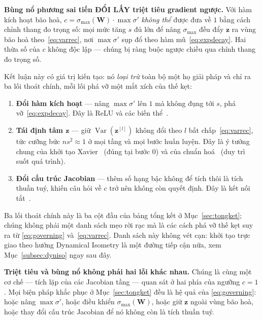 \begin{notebox}
\textbf{Bùng nổ phương sai tiến ĐỔI LẤY triệt tiêu gradient ngược.} Với hàm kích
hoạt bão hoà, $c = \sigma_{\max}(\mathbf{W})\cdot\max\sigma'$ \emph{không thể}
được đưa về $1$ bằng cách chỉnh thang đo trọng số: mọi mức tăng $s$ đủ lớn để
nâng $\sigma_{\max}$ đều đẩy $\mathbf{z}$ ra vùng bão hoà theo~\eqref{eq:varrec},
nơi $\max\sigma'$ sụp đổ theo hàm mũ~\eqref{eq:expdecay}. Hai thừa số của $c$
không độc lập --- chúng bị ràng buộc ngược chiều qua chính thang đo trọng số.
\end{notebox}

Kết luận này có giá trị kiến tạo: nó \emph{loại trừ} toàn bộ một họ giải pháp và
chỉ ra ba lối thoát chính, mỗi lối phá vỡ một mắt xích của thế kẹt:

\begin{enumerate}[leftmargin=*, itemsep=2pt]
  \item \textbf{Đổi hàm kích hoạt} --- nâng $\max\sigma'$ lên $1$ mà không đụng
    tới $s$, phá vỡ~\eqref{eq:expdecay}. Đây là ReLU và các biến thể~\cite{He2015}.
  \item \textbf{Tái định tâm $\mathbf{z}$} --- giữ $\operatorname{Var}(\mathbf{z}^{[l]})$
    không đổi theo $l$ bất chấp~\eqref{eq:varrec}, tức cưỡng bức $ns^2\approx1$ ở
    mọi tầng và mọi bước huấn luyện. Đây là ý tưởng chung của khởi tạo
    Xavier~\cite{GlorotBengio2010} (đúng tại bước $0$) và của chuẩn
    hoá~\cite{IoffeSzegedy2015} (duy trì suốt quá trình).
  \item \textbf{Đổi cấu trúc Jacobian} --- thêm số hạng bậc không để tích thôi là
    tích thuần tuý, khiến câu hỏi về $c$ trở nên không còn quyết định. Đây là kết
    nối tắt~\cite{He2016ResNet}.
\end{enumerate}

Ba lối thoát chính này là ba cột đầu của bảng tổng kết ở Mục~\ref{sec:tongket};
chúng không phải một danh sách mẹo rời rạc mà là các cách phá vỡ thế kẹt suy ra từ
\eqref{eq:governing} và~\eqref{eq:varrec}. Danh sách này không vét cạn: khởi tạo
trực giao theo hướng Dynamical Isometry là một đường tiếp cận nữa, xem
Mục~\ref{subsec:dyniso} ngay sau đây.

\begin{notebox}
\textbf{Triệt tiêu và bùng nổ không phải hai lỗi khác nhau.} Chúng là cùng một
cơ chế --- tích lặp của các Jacobian tầng --- quan sát ở hai phía của ngưỡng
$c = 1$. Mọi biện pháp khắc phục ở Mục~\ref{sec:tongket} đều là hệ quả của
\eqref{eq:governing}: hoặc nâng $\max\sigma'$, hoặc điều khiển
$\sigma_{\max}(\mathbf{W})$, hoặc giữ $\mathbf{z}$ ngoài vùng bão hoà, hoặc thay
đổi cấu trúc Jacobian để nó không còn là tích thuần tuý.
\end{notebox}

